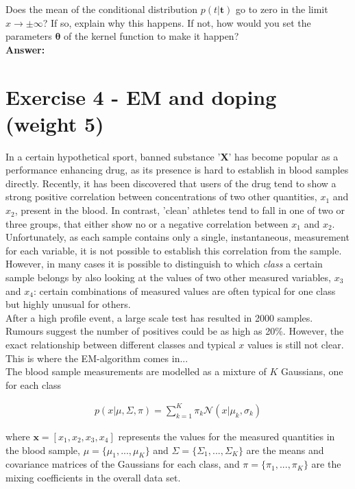 \documentclass[a4paper]{article}
\begin{document}
Does the mean of the conditional distribution $p(t | \textbf{t})$ go to zero in the limit $x \to \pm \infty$? If so, explain why this happens. If not, how would you set the parameters $\boldsymbol{\theta}$ of the kernel function to make it happen?\\

\textbf{Answer:}\\

 


\section*{Exercise 4 - EM and doping (weight 5)}

In a certain hypothetical sport, banned substance '\textbf{X}' has become popular as a performance enhancing drug, as its presence is hard to establish in blood samples directly. Recently, it has been discovered that users of the drug tend to show a strong positive correlation between concentrations of two other quantities, $x_1$ and $x_2$, present in the blood. In contrast, 'clean' athletes tend to fall in one of two or three groups, that either show no or a negative correlation between $x_1$ and $x_2$. Unfortunately, as each sample contains only a single, instantaneous, measurement for each variable, it is not possible to establish this correlation from the sample. However, in many cases it is possible to distinguish to which \textit{class} a certain sample belongs by also looking at the values of two other measured variables, $x_3$ and $x_4$: certain combinations of measured values are often typical for one class but highly unusual for others.\\
After a high profile event, a large scale test has resulted in 2000 samples. Rumours suggest the number of positives could be as high as 20\%. However, the exact relationship between different classes and typical $x$ values is still not clear. This is where the EM-algorithm comes in...\\

The blood sample measurements are modelled as a mixture of $K$ Gaussians, one for each class

\begin{eqnarray} \label{eq:7}
p(x | \mu, \Sigma, \pi) = \sum^K_{k = 1} \pi_k \mathcal{N}(x | \mu_k, \sigma_k)
\end{eqnarray}

where $\textbf{x} = [x_1, x_2, x_3, x_4]$ represents the values for the measured quantities in the blood sample, $\mu = \{ \mu_1, ..., \mu_K\}$ and $\Sigma = \{ \Sigma_1, ..., \Sigma_K\}$ are the means and covariance matrices of the Gaussians for each class, and $\pi = \{ \pi_1, ..., \pi_K\}$ are the mixing coefficients in the overall data set.\\
\end{document}

